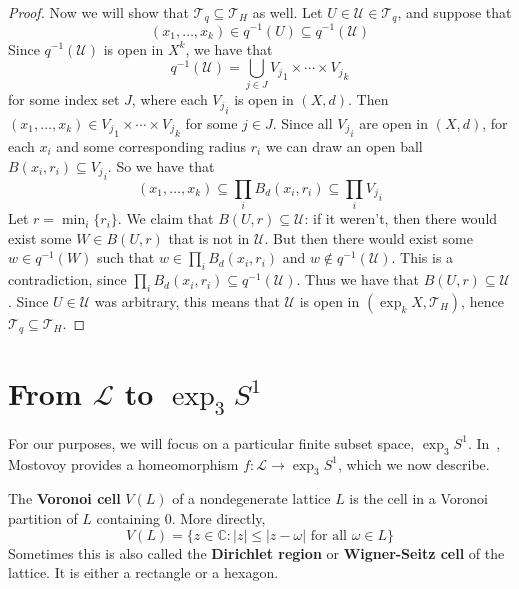 \documentclass[12pt,twoside]{reedthesis}
\theoremstyle{definition}
\newcommand{\C}{\mathbb{C}}
\newcommand{\LS}{\mathcal{L}}
\newcommand{\defnphrase}[1]{\textbf{#1}}
\begin{document}
\begin{proof}
  Now we will show that $\mathcal{T}_q \subseteq \mathcal{T}_H$ as well.
  Let $U \in \mathcal{U} \in \mathcal{T}_q$, and suppose that
  \begin{equation*}
    (x_1, \ldots, x_k) \in q^{-1}(U) \subseteq q^{-1}(\mathcal{U})
  \end{equation*}
  Since $q^{-1}(\mathcal{U})$ is open in $X^k$, we have that 
  \begin{equation*}
    q^{-1}(\mathcal{U}) = \bigcup_{j \in J} {V_j}_1 \times \cdots \times {V_j}_k
  \end{equation*}
  for some index set $J$, where each ${V_j}_i$ is open in $(X,d)$.
  Then $(x_1, \ldots, x_k) \in {V_j}_1 \times \cdots \times {V_j}_k$ for some $j \in J$.
  Since all ${V_j}_i$ are open in $(X,d)$, for each $x_i$ and some corresponding radius $r_i$ we can draw an open ball $B(x_i, r_i) \subseteq {V_j}_i$.
  So we have that
  \begin{equation*}
    (x_1, \ldots, x_k) \subseteq \prod_i B_d(x_i, r_i) \subseteq \prod_i {V_j}_i
  \end{equation*}
  Let $r = \min_i \{ r_i \}$.
  We claim that $B(U, r) \subseteq \mathcal{U}$: if it weren't, then there would exist some $W \in B(U, r)$ that is not in $\mathcal{U}$.
  But then there would exist some $w \in q^{-1}(W)$ such that $w \in \prod_i B_d(x_i, r_i)$ and $w \notin q^{-1}(\mathcal{U})$.
  This is a contradiction, since $\prod_i B_d(x_i, r_i) \subseteq q^{-1}(\mathcal{U})$.
  Thus we have that $B(U, r) \subseteq \mathcal{U}$.
  Since $U \in \mathcal{U}$ was arbitrary, this means that $\mathcal{U}$ is open in $(\exp_k X, \mathcal{T}_H)$, hence $\mathcal{T}_q \subseteq \mathcal{T}_H$.
\end{proof}

\section{From $\LS$ to $\exp_3 S^1$}\label{subsec:lattice_to_exp}

For our purposes, we will focus on a particular finite subset space, $\exp_3 S^1$.
In~\cite{mostovoy2004}, Mostovoy provides a homeomorphism $f : \LS \to \exp_3 S^1$, which we now describe.

The \defnphrase{Voronoi cell} $V(L)$ of a nondegenerate lattice $L$ is the cell in a Voronoi partition of $L$ containing $0$.
More directly,
\begin{equation*}
  V(L) = \{ z \in \C : |z| \leq |z - \omega| \text{ for all } \omega \in L \}
\end{equation*}
Sometimes this is also called the \defnphrase{Dirichlet region} or \defnphrase{Wigner-Seitz cell} of the lattice.
It is either a rectangle or a hexagon.
\end{document}
